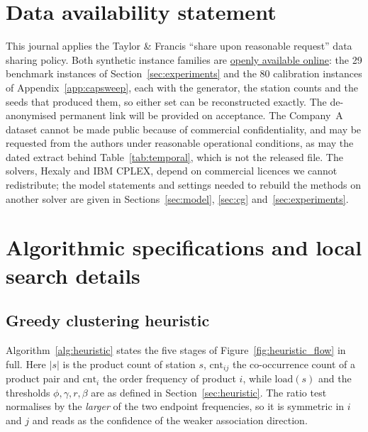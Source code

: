 \documentclass[]{interact}
\begin{document}
\section*{Data availability statement}
This journal applies the Taylor \& Francis ``share upon reasonable request'' data sharing policy. Both synthetic instance families are \href{https://anonymous.4open.science/r/Anonymized_Export_CSLAP_v2-01BC/README.md}{openly available online}: the 29 benchmark instances of Section~\ref{sec:experiments} and the 80 calibration instances of Appendix~\ref{app:capsweep}, each with the generator, the station counts and the seeds that produced them, so either set can be reconstructed exactly. The de-anonymised permanent link will be provided on acceptance. The Company~A dataset cannot be made public because of commercial confidentiality, and may be requested from the authors under reasonable operational conditions, as may the dated extract behind Table~\ref{tab:temporal}, which is not the released file. The solvers, Hexaly and IBM CPLEX, depend on commercial licences we cannot redistribute; the model statements and settings needed to rebuild the methods on another solver are given in Sections~\ref{sec:model}, \ref{sec:cg} and~\ref{sec:experiments}.





\appendix
\section{Algorithmic specifications and local search details}\label{app:algo_details}
\subsection{Greedy clustering heuristic}\label{app:heuristic}
Algorithm~\ref{alg:heuristic} states the five stages of Figure~\ref{fig:heuristic_flow} in full. Here $|s|$ is the product count of station $s$, $\mathrm{cnt}_{ij}$ the co-occurrence count of a product pair and $\mathrm{cnt}_i$ the order frequency of product $i$, while $\mathrm{load}(s)$ and the thresholds $\phi,\gamma,r,\beta$ are as defined in Section~\ref{sec:heuristic}. The ratio test normalises by the \emph{larger} of the two endpoint frequencies, so it is symmetric in $i$ and $j$ and reads as the confidence of the weaker association direction.
\end{document}

